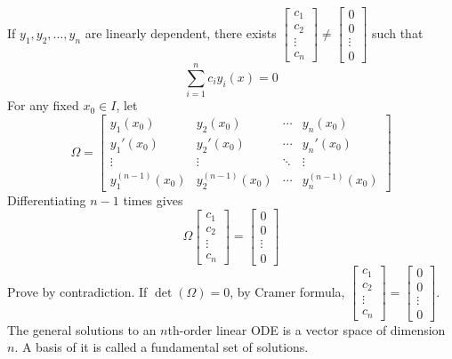 \documentclass[a4paper,12pt]{report}
\begin{document}
If $y_1,y_2,\ldots,y_n$ are linearly dependent, there exists $\begin{bmatrix}c_1\\c_2\\\vdots\\c_n\end{bmatrix}\ne\begin{bmatrix}0\\0\\\vdots\\0\end{bmatrix}$ such that
\[\sum_{i=1}^nc_iy_i(x)=0\]
For any fixed $x_0\in I$, let
\[\Omega=\begin{bmatrix}
y_1(x_0) & y_2(x_0) & \cdots & y_n(x_0) \\
y_1'(x_0) & y_2'(x_0) & \cdots & y_n'(x_0) \\
\vdots & \vdots & \ddots & \vdots \\
y_1^{(n-1)}(x_0) & y_2^{(n-1)}(x_0) & \cdots & y_n^{(n-1)}(x_0)
\end{bmatrix}\]
Differentiating $n-1$ times gives
\[\Omega\begin{bmatrix}c_1\\c_2\\\vdots\\c_n\end{bmatrix}=\begin{bmatrix}0\\0\\\vdots\\0\end{bmatrix}\]
Prove by contradiction. If $\det(\Omega)=0$, by Cramer formula, $\begin{bmatrix}c_1\\c_2\\\vdots\\c_n\end{bmatrix}=\begin{bmatrix}0\\0\\\vdots\\0\end{bmatrix}$.
\epr
{}
The general solutions to an $n$th-order linear ODE is a vector space of dimension $n$. A basis of it is called a fundamental set of solutions.
\end{document}
